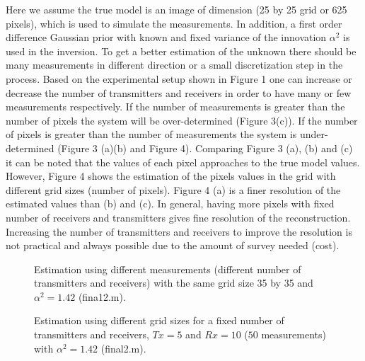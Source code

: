 \documentclass[12pt,A4]{article}
\begin{document}
Here we assume the true model is an image of dimension (25 by 25 grid or 625 pixels), which is used to simulate the measurements. In addition, a first order difference Gaussian prior with known and fixed variance of the innovation $\alpha^{2}$ is used in the inversion. To get a better estimation of the unknown there should be many measurements in different direction or a small discretization step in the process. Based on the experimental setup shown in Figure 1 one can increase or decrease the number of transmitters and receivers in order to have many or few measurements respectively. If the number of measurements is greater than the number of pixels the system will be over-determined (Figure 3(c)). If the number of pixels is greater than the number of measurements the system is under-determined (Figure 3 (a)(b) and Figure 4). Comparing Figure 3 (a), (b) and (c) it can be noted that the values of each pixel approaches to the true model values. However, Figure 4 shows the estimation of the pixels values in the grid with different grid sizes (number of pixels). Figure 4 (a) is a finer resolution of the estimated values than (b) and (c). In general, having more pixels with fixed number of receivers and transmitters gives fine resolution of the reconstruction. Increasing the number of transmitters and receivers to improve the resolution is not practical and always possible due to the amount of survey needed (cost).
\begin{center}
\begin{figure}[h]
{\par}
\caption{Estimation using different measurements (different number of transmitters and receivers) with the same grid size 35 by 35 and $\alpha^{2}=1.42$ (fina12.m).}
\end{figure}
\end{center}

\begin{center}
\begin{figure}[h]
{\par}
\caption{Estimation using different grid sizes for a fixed number of transmitters and receivers, $Tx=5$ and $Rx=10$ ($50$ measurements) with $\alpha^{2}=1.42$ (final2.m).}
\end{figure}
\end{center}
\end{document}
